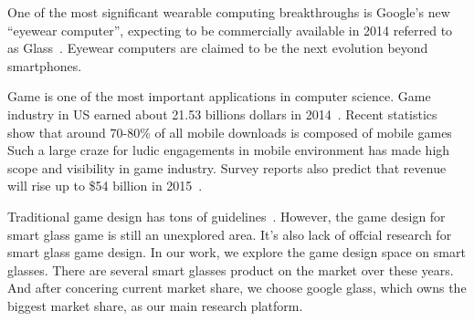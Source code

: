
One of the most significant wearable computing breakthroughs is Google's new ``eyewear computer'', expecting to be commercially available in 2014 referred to as Glass~\cite{googleglass}. Eyewear computers are claimed to be the next evolution beyond smartphones.
 
Game is one of the most important applications in computer science. Game industry in US earned about 21.53 billions dollars in 2014~\cite{essentialfacts}. Recent statistics show that around 70-80\% of all mobile downloads is composed of mobile games~\cite{statistics,infographic}
Such a large craze for ludic engagements in mobile environment has made high scope and visibility in game industry. 
Survey reports also predict that revenue will rise up to \$54 billion in 2015~\cite{statistics,infographic}.

Traditional game design has tons of guidelines~\cite{videogame,mobilegame,bodygame,gameflow,argame,wearable}. However, the game design for smart glass game is still an unexplored area. 
It's also lack of offcial research for smart glass game design. In our work, we explore the game design space on smart glasses. There are several smart glasses product on the market\cite{??} over these years. And after concering current market share, we choose google glass, which owns the biggest market share, as our main research platform.

